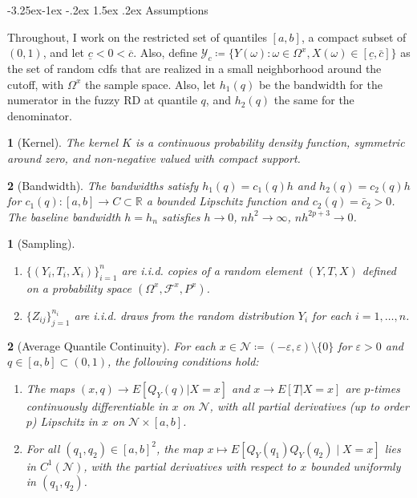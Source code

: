 \documentclass[12pt]{article}
\makeatletter
\renewcommand\subsection{\@startsection{subsection}{2}{\z@}%
  {-3.25ex\@plus -1ex \@minus -.2ex}%
  {1.5ex \@plus .2ex}%
  {\itshape\large\center}} %
\newtheorem{assumpL}{}
\newtheorem{assumpK}{}
\makeatother
\begin{document}
\subsection{Assumptions}

Throughout, I work on the restricted set of quantiles $[a,b]$, a compact subset of $(0,1)$, and let $\underline{c} < 0 < \overline{c}$. Also, define $\mathcal{Y}_c \coloneqq \{ Y(\omega): \omega \in \Omega^x, X(\omega) \in[\underline{c}, \bar{c}]\}$ as the set of random cdfs that are realized in a small neighborhood around the cutoff, with $\Omega^x$ the sample space. Also, let $h_1(q)$ be the bandwidth for the numerator in the fuzzy RD at quantile $q$, and $h_2(q)$ the same for the denominator. 

\begin{assumpK}[Kernel] \label{asspt:kernel}
The kernel $K$ is a continuous probability density function, symmetric around zero, and non-negative valued with compact support. 
\end{assumpK}

\begin{assumpK}[Bandwidth] \label{asspt:bandwidth_chiang}
The bandwidths satisfy $h_{1}(q)=c_1(q) h$ and $h_2(q) = c_2(q) h$ for $c_1(q) : [a,b] \to C \subset \mathbb{R}$ a bounded Lipschitz function and $c_2(q) = \bar{c}_2 > 0$. The baseline bandwidth $h=h_n$ satisfies $h \to 0$, $n h^2 \to \infty$, $nh^{2p+3} \to 0$.
\end{assumpK}

\begin{assumpL}[Sampling] \label{asspt:sampling} 
\begin{enumerate}
\item[(i)] \label{asspt:sampling_population}
 $\{ (Y_i, T_i, X_i) \}_{i=1}^n$ are i.i.d. copies of a random element $(Y,T,X)$ defined on a probability space $(\Omega^x, \mathcal{F}^x, P^x)$.
 \item[(ii)] $ \{ Z_{ij} \}_{j=1}^{n_i}$ are i.i.d. draws from the random distribution $Y_i$ for each $i=1,\ldots,n$.
\end{enumerate}
\end{assumpL}

\begin{assumpL}[Average Quantile Continuity]\label{asspt:average_quantile_smoothness} 
For each $x\in \mathcal{N} \coloneqq (-\varepsilon, \varepsilon) \setminus \{0\}$ for $\varepsilon > 0$ and $q\in [a,b] \subset (0,1)$, the following conditions hold:
\begin{enumerate}
\item[(i)] 
The maps $(x,q)\to E[Q_{Y}(q) | X=x]$ and $x \to E[T|X=x]$ are $p$-times continuously differentiable in $x$ on $\mathcal{N}$, 
with all partial derivatives (up to order $p$) Lipschitz in $x$ on $\mathcal{N}\times[a,b]$.
\item[(ii)] For all $\left(q_1, q_2\right) \in[a, b]^2$, the map $x \mapsto E\left[Q_Y(q_1) Q_Y(q_2) \mid X=x\right]$ lies in $C^1(\mathcal{N})$, with the partial derivatives with respect to $x$ bounded uniformly in $(q_1, q_2)$. 
\end{enumerate}
\end{assumpL}
\end{document}
